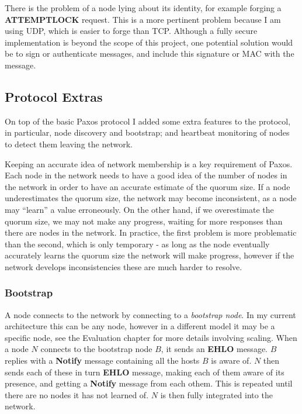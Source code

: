 \documentclass[12pt,twoside,notitlepage]{report}
\newcommand{\msg}[1] {{\bf #1}}         %
\newcommand{\op}[1]  {{\bf #1}}         %
\begin{document}
There is the problem of a node lying about its identity, for example forging a \op{ATTEMPTLOCK}
request. This is a more pertinent problem because I am using UDP, which is easier to forge than
TCP. Although a fully secure implementation is beyond the scope of this project, one potential
solution would be to sign or authenticate messages, and include this signature or MAC with the
message.


\subsection{Protocol Extras}

On top of the basic Paxos protocol I added some extra features to the protocol, in particular,
node discovery and bootstrap; and heartbeat monitoring of nodes to detect them leaving the
network.

Keeping an accurate idea of network membership is a key requirement of Paxos. Each node in the
network needs to have a good idea of the number of nodes in the network in order to have an
accurate estimate of the quorum size. If a node underestimates the quorum size, the network may
become inconsistent, as a node may ``learn'' a value erroneously. On the other hand, if we
overestimate the quorum size, we may not make any progress, waiting for more responses than there
are nodes in the network. In practice, the first problem is more problematic than the second,
which is only temporary - as long as the node eventually accurately learns the quorum size the
network will make progress, however if the network develops inconsistencies these are much harder
to resolve.


\subsubsection{Bootstrap}

A node connects to the network by connecting to a \emph{bootstrap node}. In my current
architecture this can be any node, however in a different model it may be a specific node, see the
Evaluation chapter for more details involving scaling. When a node $N$ connects to the bootstrap
node $B$, it sends an \msg{EHLO} message. $B$ replies with a \msg{Notify} message containing all the
hosts $B$ is aware of. $N$ then sends each of these in turn \msg{EHLO} message, making each of them
aware of its presence, and getting a \msg{Notify} message from each othem. This is repeated until
there are no nodes it has not learned of. $N$ is then fully integrated into the network.
\end{document}
